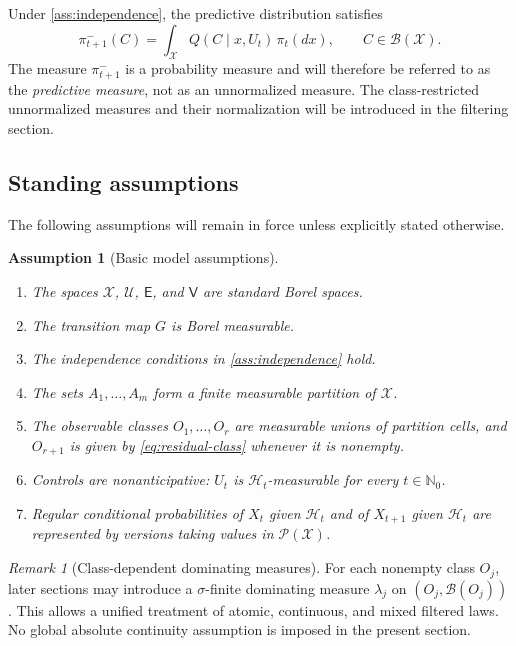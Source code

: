 \documentclass[10pt,twocolumn]{article}
\newtheorem{assumption}{Assumption}
\theoremstyle{remark}
\newtheorem{remark}{Remark}
\newcommand{\N}{\mathbb{N}}
\newcommand{\B}{\mathcal{B}}
\newcommand{\Hh}{\mathcal{H}}
\newcommand{\Pcal}{\mathcal{P}}
\newcommand{\Ucal}{\mathcal{U}}
\newcommand{\Xcal}{\mathcal{X}}
\begin{document}
Under \cref{ass:independence}, the predictive distribution satisfies
\begin{equation*}
\pi_{t+1}^{-}(C)
=
\int_{\Xcal}Q(C\mid x,U_t)\,\pi_t(dx),
\qquad C\in\B(\Xcal).
\label{eq:prediction-kernel-form}
\end{equation*}
The measure $\pi_{t+1}^{-}$ is a probability measure and will therefore be referred to as the \emph{predictive measure}, not as an unnormalized measure. The class-restricted unnormalized measures and their normalization will be introduced in the filtering section.

\subsection{Standing assumptions}
\label{subsec:standing-assumptions}

The following assumptions will remain in force unless explicitly stated otherwise.

\begin{assumption}[Basic model assumptions]
\label{ass:basic-model}
\begin{enumerate}[label=\textnormal{(A\arabic*)},leftmargin=*]
    \item The spaces $\Xcal$, $\Ucal$, $\mathsf E$, and $\mathsf V$ are standard Borel spaces.
    \item The transition map $G$ is Borel measurable.
    \item The independence conditions in \cref{ass:independence} hold.
    \item The sets $A_1,\ldots,A_m$ form a finite measurable partition of $\Xcal$.
    \item The observable classes $O_1,\ldots,O_r$ are measurable unions of partition cells, and $O_{r+1}$ is given by \cref{eq:residual-class} whenever it is nonempty.
    \item Controls are nonanticipative: $U_t$ is $\Hh_t$-measurable for every $t\in\N_0$.
    \item Regular conditional probabilities of $X_t$ given $\Hh_t$ and of $X_{t+1}$ given $\Hh_t$ are represented by versions taking values in $\Pcal(\Xcal)$.
\end{enumerate}
\end{assumption}

\begin{remark}[Class-dependent dominating measures]
\label{rem:dominating-measures}
For each nonempty class $O_j$, later sections may introduce a $\sigma$-finite dominating measure $\lambda_j$ on $(O_j,\B(O_j))$. This allows a unified treatment of atomic, continuous, and mixed filtered laws. No global absolute continuity assumption is imposed in the present section.
\end{remark}
\end{document}

